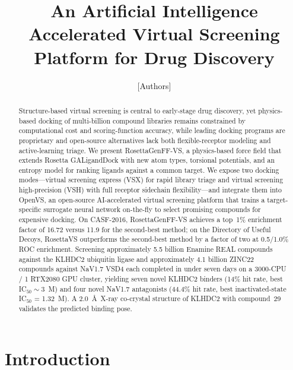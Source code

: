 \documentclass[10pt]{article}
\title{An Artificial Intelligence Accelerated Virtual Screening Platform for Drug Discovery}
\author{[Authors]}
\date{}
\begin{document}
\maketitle

\begin{abstract}
Structure-based virtual screening is central to early-stage drug discovery, yet
physics-based docking of multi-billion compound libraries remains constrained
by computational cost and scoring-function accuracy, while leading docking
programs are proprietary and open-source alternatives lack both flexible-receptor
modeling and active-learning triage. We present RosettaGenFF-VS, a physics-based
force field that extends Rosetta GALigandDock with new atom types, torsional
potentials, and an entropy model for ranking ligands against a common target.
We expose two docking modes---virtual screening express (VSX) for rapid library
triage and virtual screening high-precision (VSH) with full receptor sidechain
flexibility---and integrate them into OpenVS, an open-source AI-accelerated
virtual screening platform that trains a target-specific surrogate neural network
on-the-fly to select promising compounds for expensive docking. On CASF-2016,
RosettaGenFF-VS achieves a top~1\% enrichment factor of 16.72 versus 11.9 for
the second-best method; on the Directory of Useful Decoys, RosettaVS outperforms
the second-best method by a factor of two at 0.5/1.0\% ROC enrichment. Screening
approximately 5.5 billion Enamine REAL compounds against the KLHDC2 ubiquitin
ligase and approximately 4.1 billion ZINC22 compounds against NaV1.7 VSD4 each
completed in under seven days on a 3000-CPU / 1 RTX2080 GPU cluster, yielding
seven novel KLHDC2 binders (14\% hit rate, best IC$_{50} \sim 3$~\textmu M) and
four novel NaV1.7 antagonists (44.4\% hit rate, best inactivated-state
IC$_{50}$ = 1.32~\textmu M). A 2.0~\AA\ X-ray co-crystal structure of KLHDC2
with compound~29 validates the predicted binding pose.
\end{abstract}

\section{Introduction}
\end{document}

